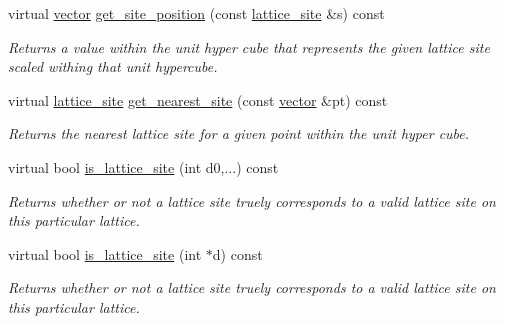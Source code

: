 \begin{DoxyCompactItemize}
\mbox{\label{classsisl_1_1cartesian__cubic_ad1f7419158bca45dfd6cc82d549e1149}} 
virtual \hyperlink{namespacesisl_a2069bd5374a9be042ff3ce3306d41e1a}{vector} \hyperlink{classsisl_1_1cartesian__cubic_ad1f7419158bca45dfd6cc82d549e1149}{get\+\_\+site\+\_\+position} (const \hyperlink{namespacesisl_acd18feee4026583db6185df2b25434aa}{lattice\+\_\+site} \&s) const
\begin{DoxyCompactList}\small\item\em Returns a value within the unit hyper cube that represents the given lattice site scaled withing that unit hypercube. \end{DoxyCompactList}\item 
\mbox{\label{classsisl_1_1cartesian__cubic_a75a8483c3ef02993c138d47236312954}} 
virtual \hyperlink{namespacesisl_acd18feee4026583db6185df2b25434aa}{lattice\+\_\+site} \hyperlink{classsisl_1_1cartesian__cubic_a75a8483c3ef02993c138d47236312954}{get\+\_\+nearest\+\_\+site} (const \hyperlink{namespacesisl_a2069bd5374a9be042ff3ce3306d41e1a}{vector} \&pt) const
\begin{DoxyCompactList}\small\item\em Returns the nearest lattice site for a given point within the unit hyper cube. \end{DoxyCompactList}\item 
\mbox{\label{classsisl_1_1cartesian__cubic_a24d53f68dc4a95343445a3edd7bc5d3d}} 
virtual bool \hyperlink{classsisl_1_1cartesian__cubic_a24d53f68dc4a95343445a3edd7bc5d3d}{is\+\_\+lattice\+\_\+site} (int d0,...) const
\begin{DoxyCompactList}\small\item\em Returns whether or not a lattice site truely corresponds to a valid lattice site on this particular lattice. \end{DoxyCompactList}\item 
\mbox{\label{classsisl_1_1cartesian__cubic_a3ae9596c32734a5b03eef4d7803d8ce4}} 
virtual bool \hyperlink{classsisl_1_1cartesian__cubic_a3ae9596c32734a5b03eef4d7803d8ce4}{is\+\_\+lattice\+\_\+site} (int $\ast$d) const
\begin{DoxyCompactList}\small\item\em Returns whether or not a lattice site truely corresponds to a valid lattice site on this particular lattice. \end{DoxyCompactList}\item 

\end{DoxyCompactItemize}
